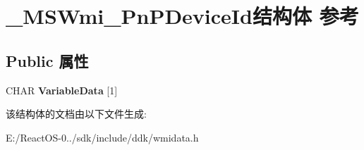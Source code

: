 \hypertarget{struct___m_s_wmi___pn_p_device_id}{}\section{\+\_\+\+M\+S\+Wmi\+\_\+\+Pn\+P\+Device\+Id结构体 参考}
\label{struct___m_s_wmi___pn_p_device_id}
\subsection*{Public 属性}
\begin{DoxyCompactItemize}
\item 
\mbox{\label{struct___m_s_wmi___pn_p_device_id_a25a32c38f92f42d37caafd33a220709d}} 
C\+H\+AR {\bfseries Variable\+Data} \mbox{[}1\mbox{]}
\end{DoxyCompactItemize}


该结构体的文档由以下文件生成\+:\begin{DoxyCompactItemize}
\item 
E\+:/\+React\+O\+S-\/0../sdk/include/ddk/wmidata.\+h\end{DoxyCompactItemize}
